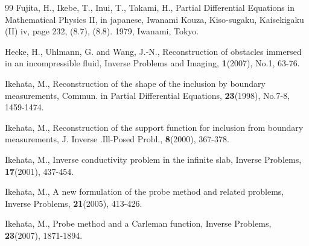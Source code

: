 \begin{thebibliography}{99}
  Fujita, H., Ikebe, T., Inui, T., Takami, H.,
          Partial Differential Equations in Mathematical Physics II, in japanese,  Iwanami Kouza, Kiso-sugaku,
          Kaisekigaku (II) iv, page 232, (8.7), (8.8). 1979, Iwanami, Tokyo.


              
              
           






  Hecke, H., Uhlmann, G. and Wang, J.-N.,
            Reconstruction of obstacles immersed in an incompressible fluid,
            Inverse Problems and Imaging, {\bf 1}(2007), No.1, 63-76.
              
              
              
              
              
              
              
              

 Ikehata, M., 
             Reconstruction of the shape of the inclusion by boundary measurements,
             Commun. in Partial Differential Equations, {\bf 23}(1998), No.7-8, 1459-1474.


              
              
              
  Ikehata, M.,
             Reconstruction of the support function for inclusion from boundary measurements,
             J. Inverse .Ill-Posed Probl., {\bf 8}(2000), 367-378.
              






 Ikehata, M., 
              Inverse conductivity problem in the infinite slab,
              Inverse Problems, {\bf 17}(2001), 437-454.











  Ikehata, M.,
           \newblock A new formulation of the probe method and related problems,
           Inverse Problems, {\bf 21}(2005), 413-426.






  Ikehata, M., 
             Probe method and a Carleman function, Inverse Problems, 
             {\bf 23}(2007), 1871-1894.
             

\end{thebibliography}
